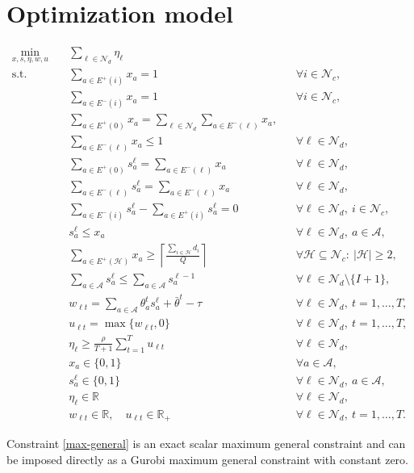 \documentclass[11pt]{article}
\begin{document}
\section{Optimization model}

\begin{align}
\min_{x,s,\eta,w,u}\quad
&\sum_{\ell\in\mathcal{N}_d}\eta_\ell
\label{obj}\\[1ex]
\text{s.t.}\quad
&\sum_{a\in E^+(i)}x_a=1
&&\forall i\in\mathcal{N}_c,
\label{customer-out}\\
&\sum_{a\in E^-(i)}x_a=1
&&\forall i\in\mathcal{N}_c,
\label{customer-in}\\
&\sum_{a\in E^+(0)}x_a
 =\sum_{\ell\in\mathcal{N}_d}\sum_{a\in E^-(\ell)}x_a,
\label{depot-balance}\\
&\sum_{a\in E^-(\ell)}x_a\leq 1
&&\forall \ell\in\mathcal{N}_d,
\label{destination-use}\\
&\sum_{a\in E^+(0)}s_a^\ell
 =\sum_{a\in E^-(\ell)}x_a
&&\forall \ell\in\mathcal{N}_d,
\label{route-start}\\
&\sum_{a\in E^-(\ell)}s_a^\ell
 =\sum_{a\in E^-(\ell)}x_a
&&\forall \ell\in\mathcal{N}_d,
\label{route-end}\\
&\sum_{a\in E^-(i)}s_a^\ell
 -\sum_{a\in E^+(i)}s_a^\ell=0
&&\forall \ell\in\mathcal{N}_d,\ i\in\mathcal{N}_c,
\label{route-flow}\\
&s_a^\ell\leq x_a
&&\forall \ell\in\mathcal{N}_d,\ a\in\mathcal{A},
\label{route-link}\\
&\sum_{a\in E^+(\mathcal{H})}x_a
 \geq
 \left\lceil\frac{\sum_{i\in\mathcal{H}}d_i}{Q}\right\rceil
&&\forall \mathcal{H}\subseteq\mathcal{N}_c:\ |\mathcal{H}|\geq 2,
\label{capacity-cuts}\\
&\sum_{a\in\mathcal{A}}s_a^\ell
 \leq
 \sum_{a\in\mathcal{A}}s_a^{\ell-1}
&&\forall \ell\in\mathcal{N}_d\setminus\{I+1\},
\label{route-ordering}\\
&w_{\ell t}
 =\sum_{a\in\mathcal{A}}\theta_a^t s_a^\ell
  +\bar\theta^t-\tau
&&\forall \ell\in\mathcal{N}_d,\ t=1,\ldots,T,
\label{affine-risk}\\
&u_{\ell t}=\max\{w_{\ell t},0\}
&&\forall \ell\in\mathcal{N}_d,\ t=1,\ldots,T,
\label{max-general}\\
&\eta_\ell
 \geq
 \frac{\rho}{T+1}\sum_{t=1}^{T}u_{\ell t}
&&\forall \ell\in\mathcal{N}_d,
\label{surrogate-risk}\\
&x_a\in\{0,1\}
&&\forall a\in\mathcal{A},
\label{x-domain}\\
&s_a^\ell\in\{0,1\}
&&\forall \ell\in\mathcal{N}_d,\ a\in\mathcal{A},
\label{s-domain}\\
&\eta_\ell\in\mathbb{R}
&&\forall \ell\in\mathcal{N}_d,
\label{eta-domain}\\
&w_{\ell t}\in\mathbb{R},\quad u_{\ell t}\in\mathbb{R}_{+}
&&\forall \ell\in\mathcal{N}_d,\ t=1,\ldots,T.
\label{aux-domains}
\end{align}

Constraint \eqref{max-general} is an exact scalar maximum general constraint and can be imposed directly as a Gurobi maximum general constraint with constant zero.
\end{document}
